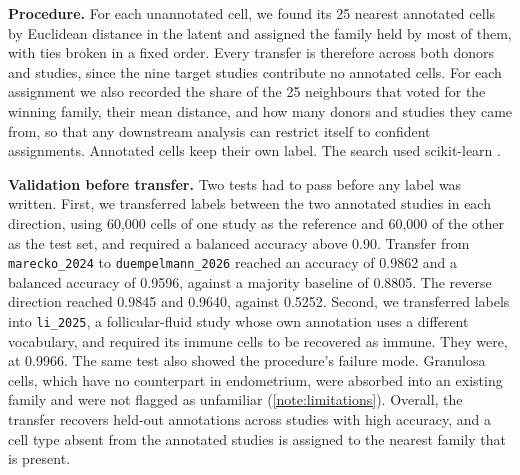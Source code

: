 \textbf{Procedure.} For each unannotated cell, we found its 25 nearest
annotated cells by Euclidean distance in the latent and assigned the
family held by most of them, with ties broken in a fixed order. Every
transfer is therefore across both donors and studies, since the nine
target studies contribute no annotated cells. For each assignment we also
recorded the share of the 25 neighbours that voted for the winning family,
their mean distance, and how many donors and studies they came from, so
that any downstream analysis can restrict itself to confident assignments.
Annotated cells keep their own label. The search used scikit-learn
\citep{pedregosa2011scikit}.

\textbf{Validation before transfer.} Two tests had to pass before any label
was written. First, we transferred labels between the two annotated
studies in each direction, using 60{,}000 cells of one study as the
reference and 60{,}000 of the other as the test set, and required a
balanced accuracy above 0.90. Transfer from \texttt{marecko\_2024} to
\texttt{duempelmann\_2026} reached an accuracy of 0.9862 and a balanced
accuracy of 0.9596, against a majority baseline of 0.8805. The reverse
direction reached 0.9845 and 0.9640, against 0.5252. Second, we
transferred labels into \texttt{li\_2025}, a follicular-fluid study whose
own annotation uses a different vocabulary, and required its immune cells
to be recovered as immune. They were, at 0.9966. The same test also showed
the procedure's failure mode. Granulosa cells, which have no counterpart in
endometrium, were absorbed into an existing family and were not flagged as
unfamiliar (\ref{note:limitations}). Overall, the
transfer recovers held-out annotations across studies with high accuracy,
and a cell type absent from the annotated studies is assigned to the
nearest family that is present.
